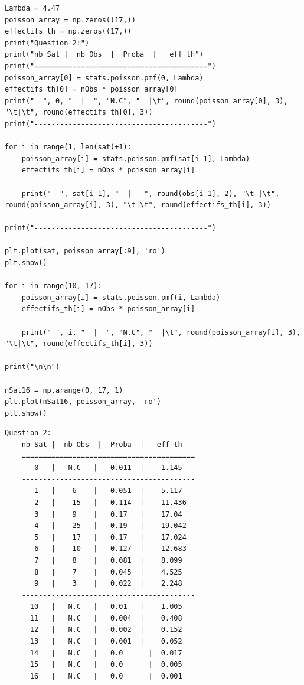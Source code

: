 \begin{lstlisting}[style=myPython, caption=Code Python question 2, frame=lines]
Lambda = 4.47
poisson_array = np.zeros((17,))
effectifs_th = np.zeros((17,))
print("Question 2:")
print("nb Sat |  nb Obs  |  Proba  |   eff th")
print("=========================================")
poisson_array[0] = stats.poisson.pmf(0, Lambda)
effectifs_th[0] = nObs * poisson_array[0]
print("  ", 0, "  |  ", "N.C", "  |\t", round(poisson_array[0], 3), "\t|\t", round(effectifs_th[0], 3))
print("-----------------------------------------")

for i in range(1, len(sat)+1):
    poisson_array[i] = stats.poisson.pmf(sat[i-1], Lambda)
    effectifs_th[i] = nObs * poisson_array[i]

    print("  ", sat[i-1], "  |   ", round(obs[i-1], 2), "\t |\t", round(poisson_array[i], 3), "\t|\t", round(effectifs_th[i], 3))

print("-----------------------------------------")

plt.plot(sat, poisson_array[:9], 'ro')
plt.show()

for i in range(10, 17):
    poisson_array[i] = stats.poisson.pmf(i, Lambda)
    effectifs_th[i] = nObs * poisson_array[i]

    print(" ", i, "  |  ", "N.C", "  |\t", round(poisson_array[i], 3), "\t|\t", round(effectifs_th[i], 3))

print("\n\n")

nSat16 = np.arange(0, 17, 1)
plt.plot(nSat16, poisson_array, 'ro')
plt.show()
\end{lstlisting}

\begin{lstlisting}[style=myLog, caption=Résultat du code, frame=lines]
Question 2:
    nb Sat |  nb Obs  |  Proba  |   eff th
    =========================================
       0   |   N.C   |	 0.011 	|	 1.145
    -----------------------------------------
       1   |    6 	 |	 0.051 	|	 5.117
       2   |    15 	 |	 0.114 	|	 11.436
       3   |    9 	 |	 0.17 	|	 17.04
       4   |    25 	 |	 0.19 	|	 19.042
       5   |    17 	 |	 0.17 	|	 17.024
       6   |    10 	 |	 0.127 	|	 12.683
       7   |    8 	 |	 0.081 	|	 8.099
       8   |    7 	 |	 0.045 	|	 4.525
       9   |    3 	 |	 0.022 	|	 2.248
    -----------------------------------------
      10   |   N.C   |	 0.01 	|	 1.005
      11   |   N.C   |	 0.004 	|	 0.408
      12   |   N.C   |	 0.002 	|	 0.152
      13   |   N.C   |	 0.001 	|	 0.052
      14   |   N.C   |	 0.0 	  |	 0.017
      15   |   N.C   |	 0.0 	  |	 0.005
      16   |   N.C   |	 0.0 	  |	 0.001
\end{lstlisting}

